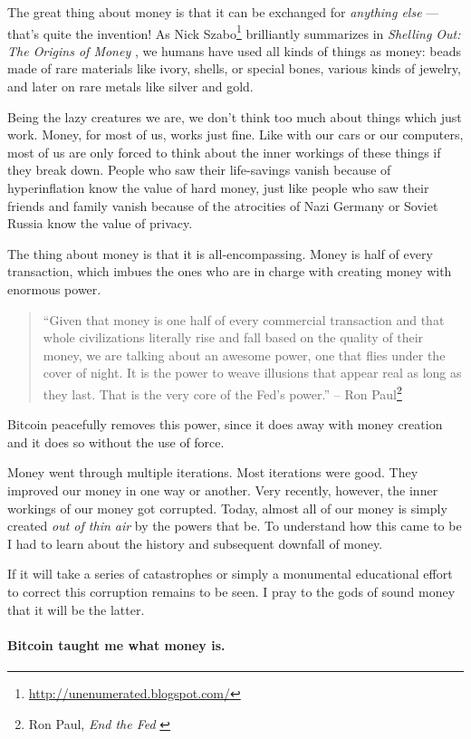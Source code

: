 The great thing about money is that it can be exchanged for \textit{anything
else} --- that's quite the invention! As Nick Szabo\footnote{\url{http://unenumerated.blogspot.com/}} brilliantly
summarizes in \textit{Shelling Out: The Origins of Money} \cite{shelling-out}, we humans have
used all kinds of things as money: beads made of rare materials like
ivory, shells, or special bones, various kinds of jewelry, and later on
rare metals like silver and gold.

Being the lazy creatures we are, we don't think too much about things
which just work. Money, for most of us, works just fine. Like with our
cars or our computers, most of us are only forced to think about the
inner workings of these things if they break down. People who saw their
life-savings vanish because of hyperinflation know the value of hard
money, just like people who saw their friends and family vanish because
of the atrocities of Nazi Germany or Soviet Russia know the value of
privacy.

The thing about money is that it is all-encompassing. Money is half of
every transaction, which imbues the ones who are in charge with creating
money with enormous power.

\begin{samepage}\begin{quotation}
\enquote{Given that money is one half of every commercial transaction and that
whole civilizations literally rise and fall based on the quality of
their money, we are talking about an awesome power, one that flies
under the cover of night. It is the power to weave illusions that
appear real as long as they last. That is the very core of the
Fed's power.}
\flushright -- Ron Paul\footnote{Ron Paul, \textit{End the Fed} \cite{end-the-fed}}
\end{quotation}\end{samepage}

Bitcoin peacefully removes this power, since it does away with money
creation and it does so without the use of force.

Money went through multiple iterations. Most iterations were good. They
improved our money in one way or another. Very recently, however, the
inner workings of our money got corrupted. Today, almost all of our
money is simply created \textit{out of thin air} by the powers that be. To
understand how this came to be I had to learn about the history and
subsequent downfall of money.

If it will take a series of catastrophes or simply a monumental
educational effort to correct this corruption remains to be seen. I pray
to the gods of sound money that it will be the latter.

\paragraph{Bitcoin taught me what money is.}

%
%
%
%
